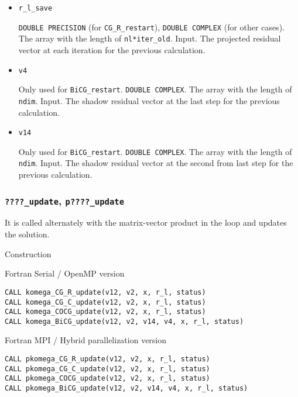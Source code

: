 \documentclass[12pt,titlepage]{article}
\begin{document}
\begin{itemize}
\item \verb|r_l_save|
  
  \verb|DOUBLE PRECISION| (for \verb|CG_R_restart|),
  \verb|DOUBLE COMPLEX| (for other cases).
  The array with the length of \verb|nl*iter_old|. Input.
  The projected residual vector at each iteration for the previous calculation.

\item \verb|v4|

  Only used for \verb|BiCG_restart|.
  \verb|DOUBLE COMPLEX|.
  The array with the length of \verb|ndim|. Input.
  The shadow residual vector at the last step for the previous calculation.

\item \verb|v14|

  Only used for \verb|BiCG_restart|.
  \verb|DOUBLE COMPLEX|.
  The array with the length of \verb|ndim|. Input.
  The shadow residual vector at the second from last step for the previous calculation.

\end{itemize}

\subsubsection{\texttt{????\_update}, \texttt{p????\_update}}

It is called alternately with the matrix-vector product in the loop and updates the solution.

\noindent Construction

\noindent Fortran Serial / OpenMP version
\begin{verbatim}
CALL komega_CG_R_update(v12, v2, x, r_l, status)
CALL komega_CG_C_update(v12, v2, x, r_l, status)
CALL komega_COCG_update(v12, v2, x, r_l, status)
CALL komega_BiCG_update(v12, v2, v14, v4, x, r_l, status)
\end{verbatim}

\noindent Fortran MPI / Hybrid parallelization version
\begin{verbatim}
CALL pkomega_CG_R_update(v12, v2, x, r_l, status)
CALL pkomega_CG_C_update(v12, v2, x, r_l, status)
CALL pkomega_COCG_update(v12, v2, x, r_l, status)
CALL pkomega_BiCG_update(v12, v2, v14, v4, x, r_l, status)
\end{verbatim}
\end{document}
